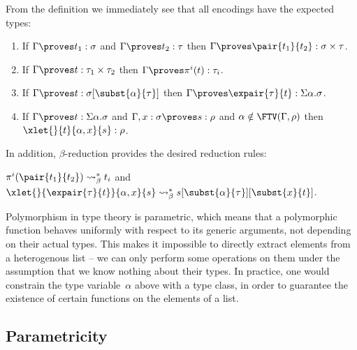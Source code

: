 
From the definition we immediately see that all encodings have the expected types:

\begin{lemma}\label{lem:encodings_types}
  \begin{enumerate}
  \item If $\Gamma \proves t_1 : \sigma$ and $\Gamma \proves t_2 :
    \tau$ then $\Gamma \proves \pair{t_1}{t_2} : \sigma \times \tau$.
  \item If $\Gamma \proves t : \tau_1 \times \tau_2$ then $\Gamma
    \proves \pi^i(t) : \tau_i$.
  \item If $\Gamma \proves t : \sigma[\subst{\alpha}{\tau}]$ then
    $\Gamma \proves \expair{\tau}{t} : \Sigma \alpha . \sigma$.
  \item If $\Gamma \proves t : \Sigma \alpha . \sigma$ and
    $\Gamma,x:\sigma \proves s : \rho$ and $\alpha \notin
    \FTV(\Gamma,\rho)$ then $\xlet{}{t}{\alpha,x}{s} : \rho$.
  \end{enumerate}
\end{lemma}

In addition, $\beta$-reduction provides the desired reduction rules:

\begin{lemma}\label{lem:encodings_reduce}
  $\pi^i(\pair{t_1}{t_2}) \leadsto_\beta^* t_i$ and
  $\xlet{}{\expair{\tau}{t}}{\alpha,x}{s} \leadsto_\beta^*
  s[\subst{\alpha}{\tau}][\subst{x}{t}]$.
\end{lemma}



Polymorphism in type theory is parametric, which means that a
polymorphic function behaves uniformly with respect to its generic
arguments, not depending on their actual types. This makes it
impossible to directly extract elements from a heterogenous list -- we
can only perform some operations on them under the assumption that we
know nothing about their types. In practice, one would constrain the
type variable~$\alpha$ above with a type class, in order to guarantee
the existence of certain functions on the elements of a list.


\subsection{Parametricity}

